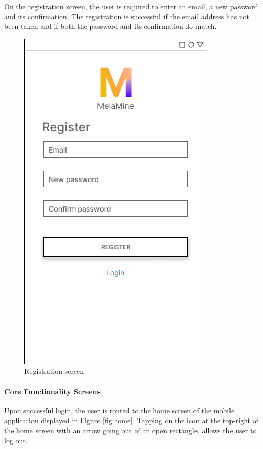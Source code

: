 \documentclass[12pt, a4paper]{article}
\begin{document}
On the registration screen, the user is required to enter an email, a new password and its confirmation. The registration is successful if the email address has not been taken and if both the password and its confirmation do match.
\begin{figure}[h]
    \centering
    \setlength{\fboxsep}{8pt}
    \includegraphics[scale=0.45, fbox]{Register.png}
    \caption{Registration screen}
    \label{fig:register}
\end{figure}
\paragraph{Core Functionality Screens}
Upon successful login, the user is routed to the home screen of the mobile application displayed in Figure \ref{fig:home}. Tapping on the icon at the top-right of the home screen with an arrow going out of an open rectangle, allows the user to log out.
\end{document}
